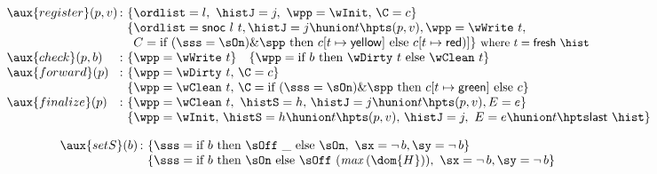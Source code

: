 {
\setlength{\belowcaptionskip}{-5pt}
\begin{figure}[t]
%
\centering
\begin{subfigure}[t]{1\textwidth}
\small
\[
\begin{array}{l@{\, :\ } l}
 \aux{register}(p,v) &
  \!\!\! \begin{array}[t]{l}
   \{\ordlist = l,\ \histJ = j,\ \wpp = \wInit,\, \C = c\}\\ 
   \{\ordlist = \mathsf{snoc}\ l\ t,
     \histJ = j \hunion t \hpts (p,v), \wpp = \wWrite\ t,\\
   \phantom{\{} C = \textrm{if}\ (\sss = \sOn) \& \spp\
                    \textrm{then}\ c[t \mapsto \mathsf{yellow}]\
                    \textrm{else}\ c[t \mapsto \mathsf{red})]\}
   \ \mbox{\small{where $t = \mathsf{fresh}\ \hist$}}
  \end{array} \\[2.5pt]
 \aux{check}(p,b) & \{\wpp = \wWrite\ t\}\quad
  \{\wpp = \textrm{if}\ b\
  \textrm{then}\ \wDirty\ t\ \textrm{else}\ \wClean\ t\}\\
  \aux{forward}(p) &
  \!\!\! \begin{array}[t]{l}
   \{\wpp = \wDirty\ t,\, \C = c \}\\ 
   \{\wpp = \wClean\ t,\, %
   \C= \textrm{if}\ (\sss=\sOn) \& \spp\ \textrm{then}\ c[t \mapsto \mathsf{green}]\ \textrm{else}\ c\}
  \end{array}\\
  \aux{finalize}(p) &
  \!\!\! \begin{array}[t]{l}
  \{\wpp = \wClean\ t,\ \histS = h,\, %
  \histJ = j \hunion t \hpts (p,v), E = e \}\\
  \{\wpp = \wInit,\, \histS = h \hunion t \hpts (p,v),\, %
     \histJ = j,\ E = e \hunion t \hpts \mathsf{last}\ \hist \}
 \end{array}
\end{array}
\]\vspace{-8mm}
\caption{\label{fig:writeauxcode}}
\hrulefill
\end{subfigure}
\begin{subfigure}[b]{1\textwidth}
\small
\[\begin{array}{l@{\, :\ }l}
  \aux{setS}(b) &
  \!\!\! \begin{array}[t]{l}
            \{ \sss = \textrm{if}\ b\ \textrm{then}\ \sOff\ \_ \ 
            \textrm{else}\ \sOn,\ \sx = \neg\, b, \sy = \neg\, b \}\\
            \{ \sss = \textrm{if}\ b\ \textrm{then}\ \sOn\ %
            \textrm{else}\ \sOff\ (\mathit{max}\, (\dom{H})),\
             \sx = \neg\, b, \sy = \neg\, b \}


\end{array}
\end{array}\]
\end{subfigure}
\end{figure}}
